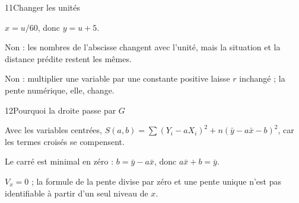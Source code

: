 \begin{corrige}{11}{Changer les unités}
\begin{questions}
\item $x=u/60$, donc $y=u+5$.
\item Non : les nombres de l’abscisse changent avec l’unité, mais la situation et la distance prédite restent les mêmes.
\item Non : multiplier une variable par une constante positive laisse $r$ inchangé ; la pente numérique, elle, change.
\end{questions}
\end{corrige}
\begin{corrige}{12}{Pourquoi la droite passe par $G$}
\begin{questions}
\item Avec les variables centrées, $S(a,b)=\sum(Y_i-aX_i)^2+n(\bar y-a\bar x-b)^2$, car les termes croisés se compensent.
\item Le carré est minimal en zéro : $b=\bar y-a\bar x$, donc $a\bar x+b=\bar y$.
\item $V_x=0$ ; la formule de la pente divise par zéro et une pente unique n’est pas identifiable à partir d’un seul niveau de $x$.
\end{questions}
\end{corrige}
